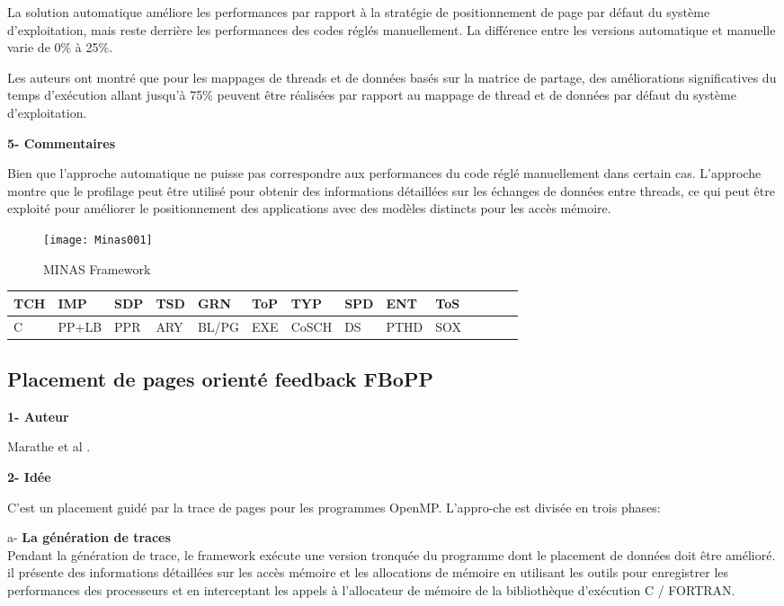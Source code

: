 La solution automatique améliore les performances par rapport à la stratégie de positionnement de page par défaut du système d'exploitation, mais reste derrière les performances des codes réglés manuellement. 
La différence entre les versions automatique et manuelle varie de 0\% à 25\%. 

Les auteurs ont montré que pour les mappages de threads et de données basés sur la matrice de partage, des améliorations significatives du temps d'exécution allant jusqu'à 75\% peuvent être réalisées par rapport au mappage de thread et de données par défaut du système d'exploitation. 

\textbf{5- Commentaires}

Bien que l'approche automatique ne puisse pas correspondre aux performances du code réglé manuellement dans certain cas.
L'approche montre que le profilage peut être utilisé pour obtenir des informations détaillées sur les échanges de données entre threads, ce qui peut être exploité pour améliorer le positionnement des applications avec des modèles distincts pour les accès mémoire.
%
\begin{figure}[h]
\texttt{[image: Minas001]}
\centering
\caption{MINAS Framework}
\label{fig:mci7}
\end{figure}   %
%
\begin{center}%
\begin{tabular}{l *{13}{l}} 		\hline
{TCH} & {IMP} 	& {SDP} 	&  {TSD} 	& {GRN} 	& {ToP} 	& {TYP} 	& {SPD}	& {ENT} 	& {ToS} \\     		\hline
C     	& PP+LB	& PPR		&  ARY		& BL/PG	& EXE		& CoSCH	& DS 		& PTHD 	& SOX  \\     		          \hline
\end{tabular}
\end{center}
%
\subsection{Placement de pages orienté feedback FBoPP}  %
%
\textbf{1- Auteur}

Marathe et al \cite{Mar62}.

\textbf{2- Idée}

C'est un placement guidé par la trace de pages pour les programmes OpenMP. 
L'appro-che est divisée en trois phases:

a- \textbf{La génération de traces}\\
Pendant la génération de trace, le framework exécute une version tronquée du programme dont le placement de données doit être amélioré. 
il présente des informations détaillées sur les accès mémoire et les allocations de mémoire en utilisant les outils pour enregistrer les performances des processeurs et 
en interceptant les appels à l'allocateur de mémoire de la bibliothèque d'exécution C / FORTRAN. 

